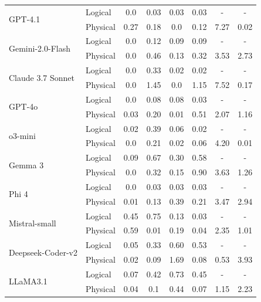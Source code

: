 \documentclass{article} %
\begin{document}
\begin{table}[h]
{\begin{tabular}{@{}llcccccc@{}}
\multirow{2}{*}{GPT-4.1} & Logical & 0.0 & 0.03 & 0.03 & 0.03 & - & - \\
 & Physical & 0.27 & 0.18 & 0.0 & 0.12 & 7.27 & 0.02 \\ \midrule
\multirow{2}{*}{Gemini-2.0-Flash} & Logical & 0.0 & 0.12 & 0.09 & 0.09 & - & - \\
 & Physical & 0.0 & 0.46 & 0.13 & 0.32 & 3.53 & 2.73 \\ \midrule
\multirow{2}{*}{Claude 3.7 Sonnet} & Logical & 0.0 & 0.33 & 0.02 & 0.02 & - & - \\
 & Physical & 0.0 & 1.45 & 0.0 & 1.15 & 7.52 & 0.17 \\ \midrule
\multirow{2}{*}{GPT-4o} & Logical & 0.0 & 0.08 & 0.08 & 0.03 & - & - \\
 & Physical & 0.03 & 0.20 & 0.01 & 0.51 & 2.07 & 1.16 \\ \midrule
\multirow{2}{*}{o3-mini} & Logical & 0.02 & 0.39 & 0.06 & 0.02 & - & - \\
 & Physical & 0.0 & 0.21 & 0.02 & 0.06 & 4.20 & 0.01 \\ \midrule
\multirow{2}{*}{Gemma 3} & Logical & 0.09 & 0.67 & 0.30 & 0.58 & - & - \\
 & Physical & 0.0 & 0.32 & 0.15 & 0.90 & 3.63 & 1.26 \\ \midrule
\multirow{2}{*}{Phi 4} & Logical & 0.0 & 0.03 & 0.03 & 0.03 & - & - \\
 & Physical & 0.01 & 0.13 & 0.39 & 0.21 & 3.47 & 2.94 \\ \midrule
\multirow{2}{*}{Mistral-small} & Logical & 0.45 & 0.75 & 0.13 & 0.03 & - & - \\
 & Physical & 0.59 & 0.01 & 0.19 & 0.04 & 2.35 & 1.01 \\ \midrule
\multirow{2}{*}{Deepseek-Coder-v2} & Logical & 0.05 & 0.33 & 0.60 & 0.53 & - & - \\
 & Physical & 0.02 & 0.09 & 1.69 & 0.08 & 0.53 & 3.93 \\ \midrule
\multirow{2}{*}{LLaMA3.1} & Logical & 0.07 & 0.42 & 0.73 & 0.45 & - & - \\
 & Physical & 0.04 & 0.1 & 0.44 & 0.07 & 1.15 & 2.23 \\
\bottomrule
\end{tabular}
}
\end{table}
\end{document}
